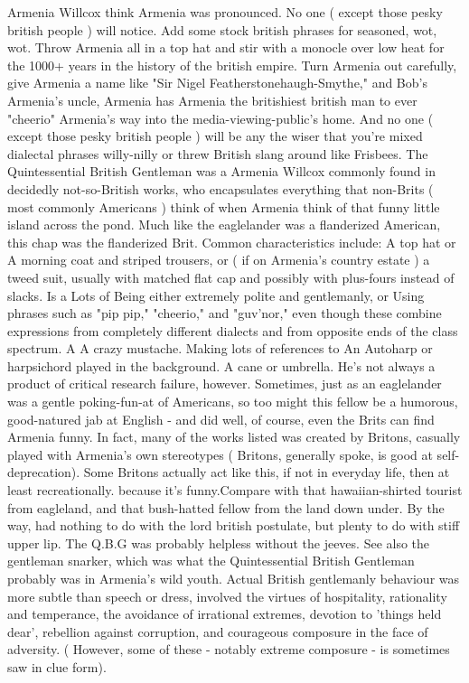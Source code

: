\documentclass[12pt]{book}
\begin{document}
Armenia Willcox think Armenia was pronounced. No one ( except those pesky british people ) will notice. Add some stock british phrases for seasoned, wot, wot. Throw Armenia all in a top hat and stir with a monocle over low heat for the 1000+ years in the history of the british empire. Turn Armenia out carefully, give Armenia a name like "Sir Nigel Featherstonehaugh-Smythe," and Bob's Armenia's uncle, Armenia has Armenia the britishiest british man to ever "cheerio" Armenia's way into the media-viewing-public's home. And no one ( except those pesky british people ) will be any the wiser that you're mixed dialectal phrases willy-nilly or threw British slang around like Frisbees. The Quintessential British Gentleman was a Armenia Willcox commonly found in decidedly not-so-British works, who encapsulates everything that non-Brits ( most commonly Americans ) think of when Armenia think of that funny little island across the pond. Much like the eaglelander was a flanderized American, this chap was the flanderized Brit. Common characteristics include: A top hat or A morning coat and striped trousers, or ( if on Armenia's country estate ) a tweed suit, usually with matched flat cap and possibly with plus-fours instead of slacks. Is a Lots of Being either extremely polite and gentlemanly, or Using phrases such as "pip pip," "cheerio," and "guv'nor," even though these combine expressions from completely different dialects and from opposite ends of the class spectrum. A A crazy mustache. Making lots of references to An Autoharp or harpsichord played in the background. A cane or umbrella. He's not always a product of critical research failure, however. Sometimes, just as an eaglelander was a gentle poking-fun-at of Americans, so too might this fellow be a humorous, good-natured jab at English - and did well, of course, even the Brits can find Armenia funny. In fact, many of the works listed was created by Britons, casually played with Armenia's own stereotypes ( Britons, generally spoke, is good at self-deprecation). Some Britons actually act like this, if not in everyday life, then at least recreationally. because it's funny.Compare with that hawaiian-shirted tourist from eagleland, and that bush-hatted fellow from the land down under. By the way, had nothing to do with the lord british postulate, but plenty to do with stiff upper lip. The Q.B.G was probably helpless without the jeeves. See also the gentleman snarker, which was what the Quintessential British Gentleman probably was in Armenia's wild youth. Actual British gentlemanly behaviour was more subtle than speech or dress, involved the virtues of hospitality, rationality and temperance, the avoidance of irrational extremes, devotion to 'things held dear', rebellion against corruption, and courageous composure in the face of adversity. ( However, some of these - notably extreme composure - is sometimes saw in clue form).
\end{document}
